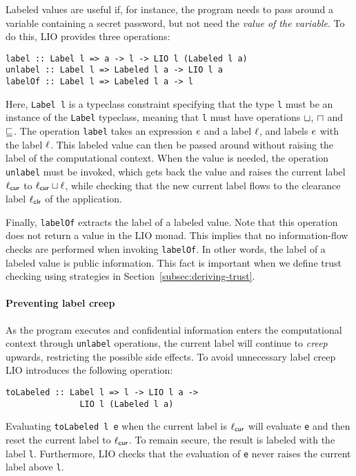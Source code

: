 Labeled values are useful if, for instance, the program needs to pass around a variable containing a secret password, but not need the \emph{value of the variable}.
To do this, LIO provides three operations:
\begin{verbatim}
label :: Label l => a -> l -> LIO l (Labeled l a)
unlabel :: Label l => Labeled l a -> LIO l a
labelOf :: Label l => Labeled l a -> l
\end{verbatim}
Here, \texttt{Label l} is a typeclass constraint specifying that the type \texttt{l} must be an instance of the \texttt{Label} typeclass, meaning that \texttt{l} must have operations $\sqcup$, $\sqcap$ and $\sqsubseteq$. The operation \texttt{label} takes an expression $e$ and a label $\ell$, and labels $e$ with the label $\ell$. This labeled value can then be passed around without raising the label of the computational context. When the value is needed, the operation \texttt{unlabel} must be invoked, which gets back the value and raises the current label $\ell_{\mathsf{cur}}$ to $\ell_{\mathsf{cur}} \sqcup \ell$, while checking that the new current label flows to the clearance label $\ell_{\mathsf{clr}}$ of the application.

Finally, \texttt{labelOf} extracts the label of a labeled value. Note that this operation does not return a value in the LIO monad. This implies that no information-flow checks are performed when invoking \texttt{labelOf}. In other words, the label of a labeled value is public information. This fact is important when we define trust checking using strategies in Section~\ref{subsec:deriving-trust}.

\paragraph{Preventing label creep}
As the program executes and confidential information enters the computational context through \texttt{unlabel} operations, the current label will continue to \emph{creep} upwards, restricting the possible side effects. To avoid unnecessary label creep LIO introduces the following operation:
\begin{verbatim}
toLabeled :: Label l => l -> LIO l a ->
               LIO l (Labeled l a)
\end{verbatim}
Evaluating \texttt{toLabeled l e} when the current label is $\ell_{\mathsf{cur}}$ will evaluate \texttt{e} and then reset the current label to $\ell_{\mathsf{cur}}$. To remain secure, the result is labeled with the label \texttt{l}. Furthermore, LIO checks that the evaluation of \texttt{e} never raises the current label above \texttt{l}.